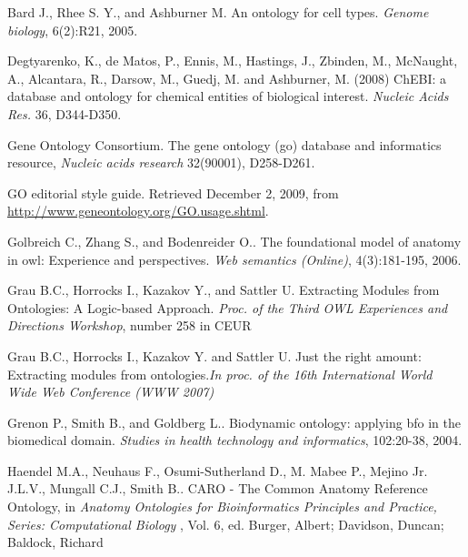 \documentclass[jou]{ao2e}%
\begin{document}
\begin{thebibliography}{}

 Bard J., Rhee S. Y., and Ashburner M. An ontology for cell types. \textit{Genome biology}, 6(2):R21, 2005. 

 Degtyarenko, K., de Matos, P., Ennis, M., Hastings, J., Zbinden, M., McNaught, A., Alcantara, R., Darsow, M., Guedj, M. and Ashburner, M. (2008) ChEBI: a database and ontology for chemical entities of biological interest. \textit{Nucleic Acids Res.} 36, D344-D350.

Gene Ontology Consortium. The gene ontology (go) database and informatics resource, \textit{Nucleic acids research} 32(90001), D258-D261.

 GO editorial style guide. Retrieved December 2, 2009, from \url{http://www.geneontology.org/GO.usage.shtml}.

 Golbreich C., Zhang S., and Bodenreider O.. The foundational model of anatomy in owl: Experience and perspectives. \textit{Web semantics (Online)}, 4(3):181-195, 2006. 

 Grau B.C., Horrocks I., Kazakov Y., and Sattler U. Extracting Modules from Ontologies: A Logic-based Approach. \textit{Proc. of the Third OWL Experiences and Directions Workshop}, number 258 in CEUR

 Grau B.C., Horrocks I., Kazakov Y. and Sattler U. Just the right amount: Extracting modules from ontologies.\textit{In proc. of the 16th International World Wide Web Conference (WWW 2007)}

 Grenon P., Smith B., and Goldberg L.. Biodynamic ontology: applying bfo in the biomedical domain. \textit{Studies in health 
technology and informatics}, 102:20-38, 2004. 

 Haendel M.A., Neuhaus F., Osumi-Sutherland D., M. Mabee P., Mejino Jr. J.L.V., Mungall C.J., Smith B.. CARO - The Common Anatomy Reference Ontology, in \textit{Anatomy Ontologies for Bioinformatics Principles and Practice, Series: Computational Biology} , Vol. 6, ed. Burger, Albert; Davidson, Duncan; Baldock, Richard


\end{thebibliography}
\end{document}
